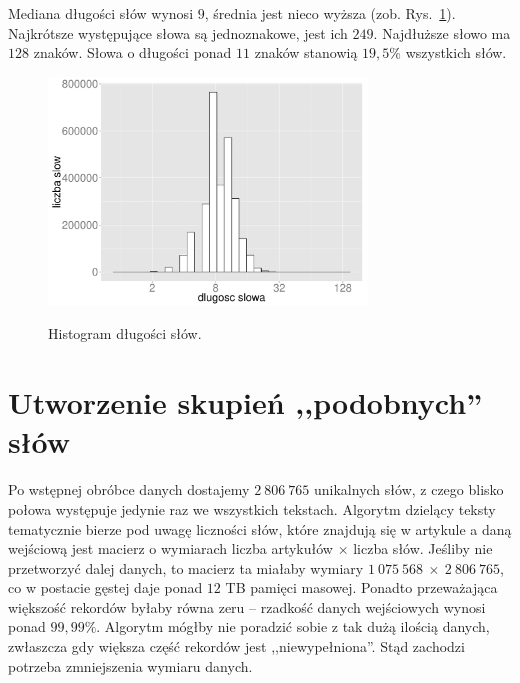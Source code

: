 \documentclass{praca1}
\begin{document}
Mediana długości słów wynosi $9$, średnia jest nieco wyższa (zob. Rys.~\ref{plot:003}). Najkrótsze występujące słowa są jednoznakowe, jest ich $249$. Najdłuższe słowo ma $128$ znaków. Słowa o długości ponad $11$ znaków stanowią $19,5\%$ wszystkich słów.

\begin{figure}[!h]
  \centering
  \includegraphics[width=240pt]{plot3.pdf}\\
  \caption{Histogram długości słów.}\label{plot:003}
\end{figure}


\section{Utworzenie skupień ,,podobnych'' słów}

Po wstępnej obróbce danych dostajemy $2\ 806\ 765$ unikalnych słów, z czego blisko połowa występuje jedynie raz we wszystkich tekstach. Algorytm dzielący teksty tematycznie bierze pod uwagę liczności słów, które znajdują się w artykule a daną wejściową jest macierz o wymiarach liczba artykułów $\times$ liczba słów. Jeśliby nie przetworzyć dalej danych, to macierz ta miałaby wymiary $1\ 075\ 568\ \times\ 2\ 806\ 765$, co w postacie gęstej daje ponad $12$ TB pamięci masowej. Ponadto przeważająca większość rekordów byłaby równa zeru -- rzadkość danych wejściowych wynosi ponad $99,99\%$. Algorytm mógłby nie poradzić sobie z tak dużą ilością danych, zwłaszcza gdy większa część rekordów jest ,,niewypełniona''. Stąd zachodzi potrzeba zmniejszenia wymiaru danych.
\end{document}
